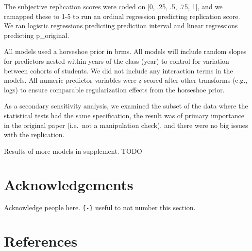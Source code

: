\documentclass[
  english,
  a4paper,
]{article}
\begin{document}
The subjective replication scores were coded on {[}0, .25, .5, .75, 1{]}, and we ramapped these to 1-5 to run an ordinal regression predicting replication score. We ran logistic regressions predicting prediction interval and linear regressions predicting p\_original.

All models used a horseshoe prior in brms. All models will include random slopes for predictors nested within years of the class (year) to control for variation between cohorts of students. We did not include any interaction terms in the models. All numeric predictor variables were z-scored after other transforms (e.g., logs) to ensure comparable regularization effects from the horseshoe prior.

As a secondary sensitivity analysis, we examined the subset of the data where the statistical tests had the same specification, the result was of primary importance in the original paper (i.e.~not a manipulation check), and there were no big issues with the replication.

Results of more models in supplement. TODO

\hypertarget{acknowledgements}{%
\section*{Acknowledgements}\label{acknowledgements}}

Acknowledge people here. \texttt{\{-\}} useful to not number this section.

\hypertarget{references}{%
\section*{References}\label{references}}
\end{document}
